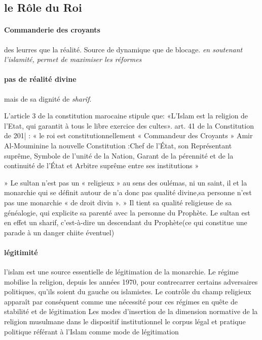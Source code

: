 \subsection{le Rôle du Roi}
\paragraph{Commanderie des croyants} des leurres que la réalité. Source de dynamique que de blocage. \textit{en soutenant l'islamité, permet de maximiser les réformes}

\paragraph{pas de réalité divine} mais de sa dignité de \textit{sharîf}. 


L'article 3 de la constitution marocaine stipule que: «L'Islam est la religion de l'Etat, qui garantit à tous le libre exercice des cultes».
  art. 41 de la Constitution de 201| : « le roi est constitutionnellement « Commandeur des Croyants » Amir Al-Mouminine   la nouvelle Constitution :Chef de l'État, son Représentant suprême, Symbole de l'unité de la Nation, Garant de la pérennité et de la continuité de l'État et Arbitre suprême entre ses institutions »


» Le sultan n'est pas un « religieux » au sens des oulémas, ni un saint, il et la monarchie qui se définit autour de n'a donc pas qualité divine,sa personne n'est pas une monarchie « de droit divin ».
» Il tient sa qualité religieuse de sa généalogie, qui explicite sa parenté avec la personne du Prophète.
  Le sultan est en effet un sharif, c'est-à-dire un descendant du Prophète(ce qui constitue une parade à un danger chiite éventuel)

\paragraph{légitimité}

 l'islam est une source essentielle de légitimation de la monarchie.
  Le régime mobilise la religion, depuis les années 1970, pour contrecarrer certains adversaires politiques, qu'ils soient du gauche ou islamistes.
  Le contrôle du champ religieux apparaît par conséquent comme une nécessité pour ces régimes en quête de stabilité et de légitimation   Les modes d'insertion de la dimension normative de la religion musulmane dans le dispositif institutionnel le corpus légal et pratique politique référant à l'Islam comme mode de légitimation



